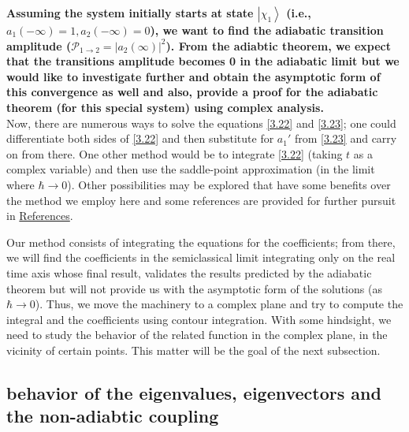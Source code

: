 \documentclass[12pt,a4paper]{article}
\begin{document}
	\textbf{Assuming the system initially starts at state $\left| \chi_{1} \right\rangle$ (i.e., $a_{1} (-\infty) = 1, a_{2}(-\infty) = 0$), we want to find the adiabatic transition amplitude ($\mathcal{P}_{1 \rightarrow 2} = \left| a_{2}(\infty) \right|^{2}$). From the adiabtic theorem, we expect that the transitions amplitude becomes 0 in the adiabatic limit but we would like to investigate further and obtain the asymptotic form of this convergence as well and also, provide a proof for the adiabatic theorem (for this special system) using complex analysis.}
	\\
	
	Now, there are numerous ways to solve the equations \eqref{3.22} and \eqref{3.23}; one could differentiate both sides of \eqref{3.22} and then substitute for $a_{1}'$ from \eqref{3.23} and carry on from there. One other method would be to integrate \eqref{3.22} (taking $t$ as a complex variable) and then use the saddle-point approximation (in the limit where $\hbar \rightarrow 0$). Other possibilities may be explored that have some benefits over the method we employ here and some references are provided for further pursuit in \hyperref[sec:References]{References}.
	
	Our method consists of integrating the equations for the coefficients; from there, we will find the coefficients in the semiclassical limit integrating only on the real time axis whose final result, validates the results predicted by the adiabatic theorem but will not provide us with the asymptotic form of the solutions (as $\hbar \rightarrow 0$). Thus, we move the machinery to a complex plane and try to compute the integral and the coefficients using contour integration. With some hindsight, we need to study the behavior of the related function in the complex plane, in the vicinity of certain points. This matter will be the goal of the next subsection.
	
	\subsection{behavior of the eigenvalues, eigenvectors and the non-adiabtic coupling}
	\label{subsec:behavior of functions}
	
\end{document}
